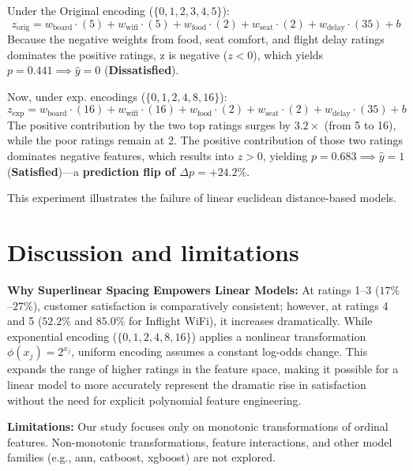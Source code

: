 \documentclass[10pt,a4paper]{article}
\begin{document}
Under the Original encoding ($\{0, 1, 2, 3, 4, 5\}$):
\begin{equation}
    z_{\text{orig}} = w_{\text{board}} \cdot (5) + w_{\text{wifi}} \cdot (5) + w_{\text{food}} \cdot (2) + w_{\text{seat}} \cdot (2) + w_{\text{delay}} \cdot (35) + b
\end{equation}
Because the negative weights from food, seat comfort, and flight delay ratings dominates the positive ratings, z is negative ($z < 0$), which yields $p = 0.441 \implies \hat{y} = 0$ (\textbf{Dissatisfied}).

Now, under exp. encodings ($\{0, 1, 2, 4, 8, 16\}$):
\begin{equation}
    z_{\text{exp}} = w_{\text{board}} \cdot (16) + w_{\text{wifi}} \cdot (16) + w_{\text{food}} \cdot (2) + w_{\text{seat}} \cdot (2) + w_{\text{delay}} \cdot (35) + b
\end{equation}
The positive contribution by the two top ratings surges by $3.2\times$ (from 5 to 16), while the poor ratings remain at 2. The positive contribution of those two ratings dominates negative features, which results into $z > 0$, yielding $p = 0.683 \implies \hat{y} = 1$ (\textbf{Satisfied})---a \textbf{prediction flip of $\Delta p = +24.2\%$}.

This experiment illustrates the failure of linear euclidean distance-based models.

\section{Discussion and limitations}

\textbf{Why Superlinear Spacing Empowers Linear Models:}
At ratings 1--3 ($17\%$--$27\%$), customer satisfaction is comparatively consistent; however, at ratings 4 and 5 ($52.2\%$ and $85.0\%$ for Inflight WiFi), it increases dramatically. While exponential encoding ($\{0, 1, 2, 4, 8, 16\}$) applies a nonlinear transformation $\phi(x_j)=2^{x_j}$, uniform encoding assumes a constant log-odds change. This expands the range of higher ratings in the feature space, making it possible for a linear model to more accurately represent the dramatic rise in satisfaction without the need for explicit polynomial feature engineering.

\textbf{Limitations:} Our study focuses only on monotonic transformations of ordinal features. Non-monotonic transformations, feature interactions, and other model families (e.g., ann, catboost, xgboost) are not explored.
\end{document}
